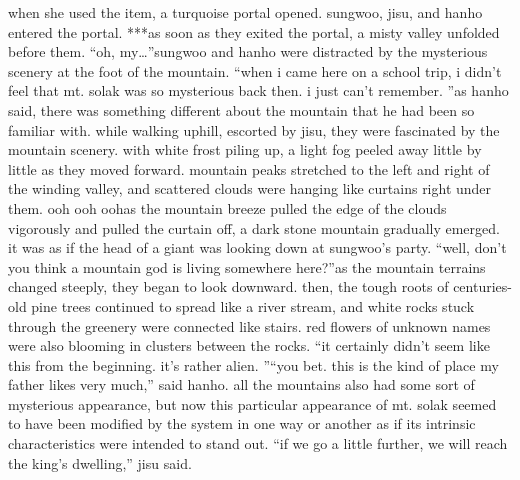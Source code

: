 when she used the item, a turquoise portal opened.
sungwoo, jisu, and hanho entered the portal.
***as soon as they exited the portal, a misty valley unfolded before them.
“oh, my…”sungwoo and hanho were distracted by the mysterious scenery at the foot of the mountain.
“when i came here on a school trip, i didn’t feel that mt.
 solak was so mysterious back then.
 i just can’t remember.
”as hanho said, there was something different about the mountain that he had been so familiar with.
while walking uphill, escorted by jisu, they were fascinated by the mountain scenery.
with white frost piling up, a light fog peeled away little by little as they moved forward.
mountain peaks stretched to the left and right of the winding valley, and scattered clouds were hanging like curtains right under them.
ooh ooh oohas the mountain breeze pulled the edge of the clouds vigorously and pulled the curtain off, a dark stone mountain gradually emerged.
 it was as if the head of a giant was looking down at sungwoo’s party.
“well, don’t you think a mountain god is living somewhere here?”as the mountain terrains changed steeply, they began to look downward.
then, the tough roots of centuries-old pine trees continued to spread like a river stream, and white rocks stuck through the greenery were connected like stairs.
red flowers of unknown names were also blooming in clusters between the rocks.
“it certainly didn’t seem like this from the beginning.
 it’s rather alien.
”“you bet.
 this is the kind of place my father likes very much,” said hanho.
all the mountains also had some sort of mysterious appearance, but now this particular appearance of mt.
 solak seemed to have been modified by the system in one way or another as if its intrinsic characteristics were intended to stand out.
“if we go a little further, we will reach the king’s dwelling,” jisu said.


 